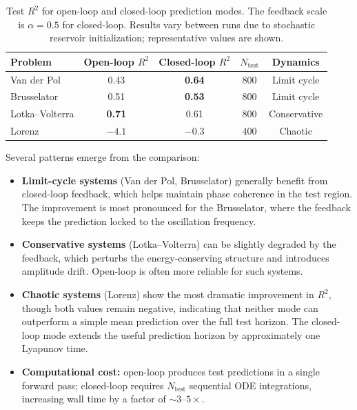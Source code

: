 \documentclass[11pt,twocolumn]{article}
\begin{document}
\begin{table}[t]
\centering
\caption{Test $R^2$ for open-loop and closed-loop prediction modes.  The
  feedback scale is $\alpha=0.5$ for closed-loop.  Results vary between runs
  due to stochastic reservoir initialization; representative values are shown.}
\label{tab:mode_comparison}
\small
\begin{tabular}{@{}lcccc@{}}
\hline
Problem & Open-loop $R^2$ & Closed-loop $R^2$ & $N_{\text{test}}$ & Dynamics \\
\hline
Van der Pol     & 0.43  & \textbf{0.64}  & 800 & Limit cycle \\
Brusselator     & 0.51  & \textbf{0.53}  & 800 & Limit cycle \\
Lotka--Volterra & \textbf{0.71}  & 0.61  & 800 & Conservative \\
Lorenz          & $-4.1$ & $\mathbf{-0.3}$  & 400 & Chaotic \\
\hline
\end{tabular}
\end{table}

Several patterns emerge from the comparison:

\begin{itemize}
  \item \textbf{Limit-cycle systems} (Van der Pol, Brusselator) generally
    benefit from closed-loop feedback, which helps maintain phase coherence
    in the test region.  The improvement is most pronounced for the
    Brusselator, where the feedback keeps the prediction locked to the
    oscillation frequency.
  \item \textbf{Conservative systems} (Lotka--Volterra) can be slightly
    degraded by the feedback, which perturbs the energy-conserving structure
    and introduces amplitude drift.  Open-loop is often more reliable for
    such systems.
  \item \textbf{Chaotic systems} (Lorenz) show the most dramatic improvement
    in $R^2$, though both values remain negative, indicating that neither mode
    can outperform a simple mean prediction over the full test horizon.  The
    closed-loop mode extends the useful prediction horizon by approximately
    one Lyapunov time.
  \item \textbf{Computational cost:} open-loop produces test predictions in
    a single forward pass; closed-loop requires $N_{\text{test}}$ sequential
    ODE integrations, increasing wall time by a factor of $\sim\!3$--$5\times$.
\end{itemize}
\end{document}
